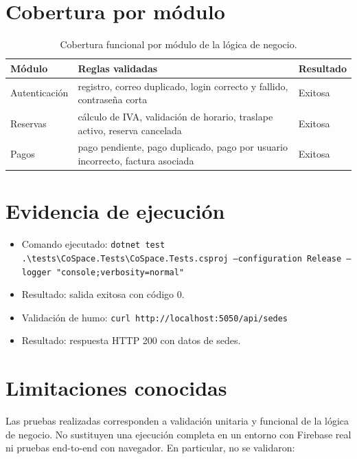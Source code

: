\documentclass[11pt,a4paper]{report}
\begin{document}
\section{Cobertura por módulo}

\begin{table}[H]
\centering
\small
\renewcommand{\arraystretch}{1.25}
\begin{tabularx}{\textwidth}{|>{\raggedright\arraybackslash}p{3.5cm}|>{\raggedright\arraybackslash}X|>{\raggedright\arraybackslash}p{2.5cm}|}
\hline
\rowcolor{mint}
\textbf{Módulo} & \textbf{Reglas validadas} & \textbf{Resultado} \\ \hline
Autenticación & registro, correo duplicado, login correcto y fallido, contraseña corta & Exitosa \\ \hline
Reservas & cálculo de IVA, validación de horario, traslape activo, reserva cancelada & Exitosa \\ \hline
Pagos & pago pendiente, pago duplicado, pago por usuario incorrecto, factura asociada & Exitosa \\ \hline
\end{tabularx}
\caption{Cobertura funcional por módulo de la lógica de negocio.}
\end{table}

\section{Evidencia de ejecución}

\begin{itemize}[leftmargin=1.5em,itemsep=0.4em]
    \item Comando ejecutado: \texttt{dotnet test .\textbackslash tests\textbackslash CoSpace.Tests\textbackslash CoSpace.Tests.csproj --configuration Release --logger "console;verbosity=normal"}
    \item Resultado: salida exitosa con código 0.
    \item Validación de humo: \texttt{curl http://localhost:5050/api/sedes}
    \item Resultado: respuesta HTTP 200 con datos de sedes.
\end{itemize}

\section{Limitaciones conocidas}

\noindent Las pruebas realizadas corresponden a validación unitaria y funcional de la lógica de negocio. No sustituyen una ejecución completa en un entorno con Firebase real ni pruebas end-to-end con navegador. En particular, no se validaron:
\end{document}
